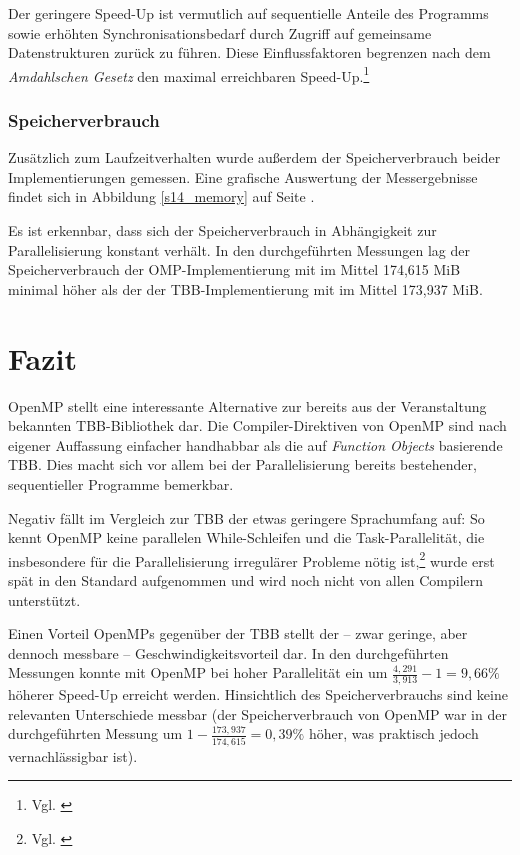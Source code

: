 \documentclass[11pt]{scrartcl}
\begin{document}
Der geringere Speed-Up ist vermutlich auf sequentielle Anteile des Programms sowie erhöhten Synchronisationsbedarf durch Zugriff auf gemeinsame Datenstrukturen zurück zu führen. Diese Einflussfaktoren begrenzen nach dem \emph{Amdahlschen Gesetz} den maximal erreichbaren Speed-Up.\footnote{Vgl. \cite[S.~318]{bengel_masterkurs_2008}}

\subsubsection{Speicherverbrauch}

Zusätzlich zum Laufzeitverhalten wurde außerdem der Speicherverbrauch beider Implementierungen gemessen. Eine grafische Auswertung der Messergebnisse findet sich in Abbildung \ref{s14_memory} auf Seite \pageref{s14_memory}.

Es ist erkennbar, dass sich der Speicherverbrauch in Abhängigkeit zur Parallelisierung konstant verhält. In den durchgeführten Messungen lag der Speicherverbrauch der OMP-Implementierung mit im Mittel 174,615 MiB minimal höher als der der TBB-Implementier\-ung mit im Mittel 173,937 MiB.

\section{Fazit}

OpenMP stellt eine interessante Alternative zur bereits aus der Veranstaltung bekannten TBB-Bibliothek dar. Die Compiler-Direktiven von OpenMP sind nach eigener Auffassung einfacher handhabbar als die auf \emph{Function Objects} basierende TBB. Dies macht sich vor allem bei der Parallelisierung bereits bestehender, sequentieller Programme bemerkbar.

Negativ fällt im Vergleich zur TBB der etwas geringere Sprachumfang auf: So kennt OpenMP keine parallelen While-Schleifen und die Task-Parallelität, die insbesondere für die Parallelisierung irregulärer Probleme nötig ist,\footnote{Vgl. \cite[S.~6]{duran_tasking_2009}} wurde erst spät in den Standard aufgenommen und wird noch nicht von allen Compilern unterstützt.

Einen Vorteil OpenMPs gegenüber der TBB stellt der -- zwar geringe, aber dennoch messbare -- Geschwindigkeitsvorteil dar. In den durchgeführten Messungen konnte mit OpenMP bei hoher Parallelität ein um $\frac{4,291}{3,913}-1 = 9,66\%$ höherer Speed-Up erreicht werden. Hinsichtlich des Speicherverbrauchs sind keine relevanten Unterschiede messbar (der Speicherverbrauch von OpenMP war in der durchgeführten Messung um $1-\frac{173,937}{174,615} = 0,39\%$ höher, was praktisch jedoch vernachlässigbar ist).
\end{document}
